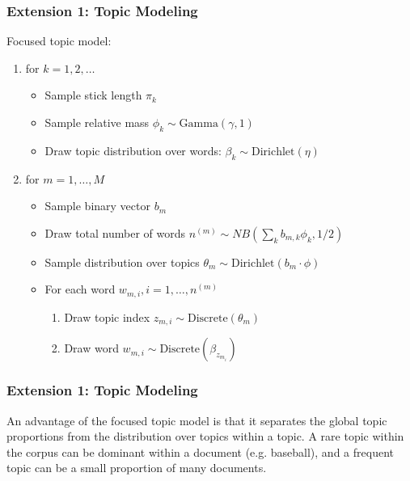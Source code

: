 \documentclass[13pt]{beamer}
\begin{document}
\begin{frame}
\frametitle{Extension 1: Topic Modeling}


Focused topic model:
\begin{enumerate}
\item for $k=1,2,\ldots$
  \begin{itemize}
  \item Sample stick length $\pi_k$
  \item Sample relative mass $\phi_k \sim \text{Gamma}(\gamma, 1)$
  \item Draw topic distribution over words: $\beta_k \sim \text{Dirichlet}(\eta)$
  \end{itemize}
\item for $m=1,\ldots,M$
  \begin{itemize}
  \item Sample binary vector $b_m$
  \item Draw total number of words $n^{(m)} \sim NB(\sum_k b_{m,k} \phi_k, 1/2)$
  \item Sample distribution over topics $\theta_m \sim \text{Dirichlet}(b_m \cdot \phi)$
  \item For each word $w_{m,i}, i=1,\ldots,n^{(m)}$
    \begin{enumerate}
    \item Draw topic index $z_{m,i} \sim \text{Discrete}(\theta_m)$ 
    \item Draw word $w_{m,i} \sim \text{Discrete}(\beta_{z_{m_i}})$
    \end{enumerate}
  \end{itemize}
\end{enumerate}

\end{frame}
\begin{frame}
\frametitle{Extension 1: Topic Modeling}


An advantage of the focused topic model is that it separates the global topic proportions from the distribution over topics within a topic. A rare topic within the corpus can be dominant within a document (e.g. baseball), and a frequent topic can be a small proportion of many documents.

\end{frame}
\end{document}
